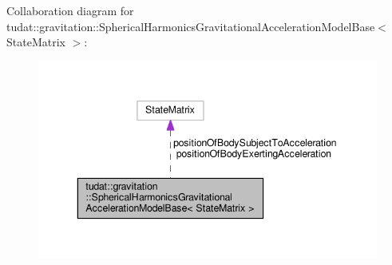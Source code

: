 Collaboration diagram for tudat\+:\+:gravitation\+:\+:Spherical\+Harmonics\+Gravitational\+Acceleration\+Model\+Base$<$ State\+Matrix $>$\+:
\nopagebreak
\begin{figure}[H]
\begin{center}
\leavevmode
\includegraphics[width=343pt]{classtudat_1_1gravitation_1_1SphericalHarmonicsGravitationalAccelerationModelBase__coll__graph}
\end{center}
\end{figure}
